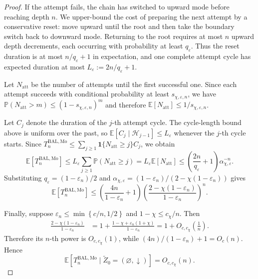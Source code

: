 \documentclass{article}
\numberwithin{theorem}{section}
\numberwithin{proposition}{section}
\numberwithin{corollary}{section}
\numberwithin{lemma}{section}
\numberwithin{conjecture}{section}
\numberwithin{remark}{section}
\numberwithin{definition}{section}
\numberwithin{assumption}{section}
\numberwithin{example}{section}
\newcommand{\calH}{{\mathcal{H}}}
\newcommand{\bbE}{\mathbb{E}}
\newcommand{\bbP}{\mathbb{P}}
\newcommand{\lbra}[1]{\left[#1\right]}
\newcommand{\mbra}[1]{\left\{#1\right\}}
\newcommand{\sbra}[1]{\left(#1\right)}
\begin{document}
\begin{proof}
If the attempt fails, the chain has switched to upward mode before reaching
depth $n$. We upper-bound the cost of preparing the next attempt by a
conservative reset: move upward until the root and then take the boundary
switch back to downward mode. Returning to the root requires at most $n$
upward depth decrements, each occurring with probability at least
$q_\varepsilon$. Thus the reset duration is at most $n/q_\varepsilon+1$
in expectation, and one complete attempt cycle has expected duration at most
$L_\varepsilon:=2n/q_\varepsilon+1$.

Let $N_{\mathrm{att}}$ be the number of attempts until the first successful
one. Since each attempt succeeds with conditional probability at least
$s_{\chi,\varepsilon,n}$, we have
$\bbP(N_{\mathrm{att}}>m)\le(1-s_{\chi,\varepsilon,n})^m$ and therefore
$\bbE[N_{\mathrm{att}}]\le 1/s_{\chi,\varepsilon,n}$.

Let $C_j$ denote the duration of the $j$-th attempt cycle. The cycle-length
bound above is uniform over the past, so
$\bbE[C_j\mid \calH_{j-1}]\le L_\varepsilon$ whenever the $j$-th cycle
starts. Since
$T_n^{\mathrm{BAL,Mo}}\le
\sum_{j\ge1}\mathbf 1\{N_{\mathrm{att}}\ge j\}C_j$,
we obtain
\begin{equation*}
    \bbE[T_n^{\mathrm{BAL,Mo}}]
    \le
    L_\varepsilon\sum_{j\ge1}\bbP(N_{\mathrm{att}}\ge j)
    =
    L_\varepsilon\bbE[N_{\mathrm{att}}]
    \le
    \left(\frac{2n}{q_\varepsilon}+1\right)
    \alpha_{\chi,\varepsilon}^{-n}.
\end{equation*}
Substituting $q_\varepsilon=(1-\varepsilon_n)/2$ and
$\alpha_{\chi,\varepsilon}=(1-\varepsilon_n)/(2-\chi(1-\varepsilon_n))$
gives
\begin{equation*}
    \bbE[T_n^{\mathrm{BAL,Mo}}]
    \le
    \sbra{
        \frac{4n}{1-\varepsilon_n}+1
    }
    \sbra{
        \frac{2-\chi(1-\varepsilon_n)}
             {1-\varepsilon_n}
    }^n .
\end{equation*}

Finally, suppose $\varepsilon_n\le \min\mbra{c/n,1/2}$ and
$1-\chi\le c_\chi/n$. Then
\begin{align*}
    \frac{2-\chi(1-\varepsilon_n)}
         {1-\varepsilon_n}
    &=
    1+
    \frac{
        1-\chi+\varepsilon_n(1+\chi)
    }{
        1-\varepsilon_n
    }=
    1+O_{c,c_\chi}\!\left(\frac1n\right).
\end{align*}
Therefore its $n$-th power is $O_{c,c_\chi}(1)$, while
$(4n)/(1-\varepsilon_n)+1=O_c(n)$. Hence
\begin{equation*}
    \bbE\lbra{
        T_n^{\mathrm{BAL,Mo}}
        \mid
        \widetilde Z_0=(\varnothing,\downarrow)
    }
    =
    O_{c,c_\chi}(n).
\end{equation*}
\end{proof}
\end{document}

